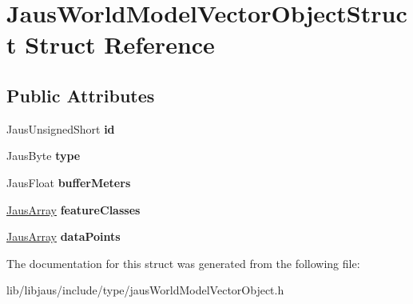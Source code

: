 \hypertarget{struct_jaus_world_model_vector_object_struct}{\section{\-Jaus\-World\-Model\-Vector\-Object\-Struct \-Struct \-Reference}
\label{struct_jaus_world_model_vector_object_struct}
}
\subsection*{\-Public \-Attributes}
\begin{DoxyCompactItemize}
\item 
\hypertarget{struct_jaus_world_model_vector_object_struct_a948f37b65006394c5b489a3610a562df}{\-Jaus\-Unsigned\-Short {\bfseries id}}\label{struct_jaus_world_model_vector_object_struct_a948f37b65006394c5b489a3610a562df}

\item 
\hypertarget{struct_jaus_world_model_vector_object_struct_afcb18ca9ff701bdec40ff8c7fc691425}{\-Jaus\-Byte {\bfseries type}}\label{struct_jaus_world_model_vector_object_struct_afcb18ca9ff701bdec40ff8c7fc691425}

\item 
\hypertarget{struct_jaus_world_model_vector_object_struct_a41f1ab701691f85954745bb7e7d09cfe}{\-Jaus\-Float {\bfseries buffer\-Meters}}\label{struct_jaus_world_model_vector_object_struct_a41f1ab701691f85954745bb7e7d09cfe}

\item 
\hypertarget{struct_jaus_world_model_vector_object_struct_aacfc0dab3bbf2eebbba573f0e4b52b4f}{\hyperlink{struct_jaus_array_struct}{\-Jaus\-Array} {\bfseries feature\-Classes}}\label{struct_jaus_world_model_vector_object_struct_aacfc0dab3bbf2eebbba573f0e4b52b4f}

\item 
\hypertarget{struct_jaus_world_model_vector_object_struct_a6e1863897e5d847309da2209258b9041}{\hyperlink{struct_jaus_array_struct}{\-Jaus\-Array} {\bfseries data\-Points}}\label{struct_jaus_world_model_vector_object_struct_a6e1863897e5d847309da2209258b9041}

\end{DoxyCompactItemize}


\-The documentation for this struct was generated from the following file\-:\begin{DoxyCompactItemize}
\item 
lib/libjaus/include/type/jaus\-World\-Model\-Vector\-Object.\-h\end{DoxyCompactItemize}
